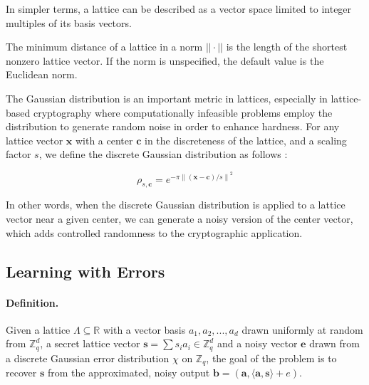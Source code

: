 \documentclass[11pt,
  titlepage=false,
  abstract=on,
]{scrreprt}
\begin{document}
In simpler terms, a lattice can be described as a vector space limited to integer multiples of its basis vectors.

The minimum distance of a lattice in a norm $||\cdot||$ is the length of the shortest nonzero lattice vector. If the norm is unspecified, the default
value is the Euclidean norm.

The Gaussian distribution is an important metric in lattices, especially in lattice-based cryptography where computationally infeasible problems employ the distribution
to generate random noise in order to enhance hardness. For any lattice vector $\mathbf{x}$ with a center $\mathbf{c}$ in the discreteness of the lattice, and a scaling factor $s$,
we define the discrete Gaussian distribution as follows \cite{WCToAVGCase}:

\begin{equation*}
  \rho_{s,\mathbf{c}} = e^{-\pi {\| (\mathbf{x} - \mathbf{c}) / s\|}^2}
\end{equation*}

In other words, when the discrete Gaussian distribution is applied to a lattice vector near a given center, we can generate a noisy version of the center vector, which adds controlled randomness 
to the cryptographic application.

\subsection{Learning with Errors}
\paragraph{Definition.} Given a lattice $\Lambda \subseteq \mathbb{R}$ with a vector basis $a_1, a_2,..., a_d$ drawn uniformly at random from $\mathbb{Z}^d_q$, a secret lattice vector $\mathbf{s}=\sum s_ia_i \in \mathbb{Z}^d_q$ 
and a noisy vector $\mathbf{e}$ drawn from a discrete Gaussian error distribution $\chi$ on $\mathbb{Z}_q$, the goal of the problem is to recover $\mathbf{s}$ from the approximated, noisy output 
$\mathbf{b} = (\mathbf{a}, \langle \mathbf{a}, \mathbf{s} \rangle + e)$. \cite{regev2010learning}\\
\end{document}
